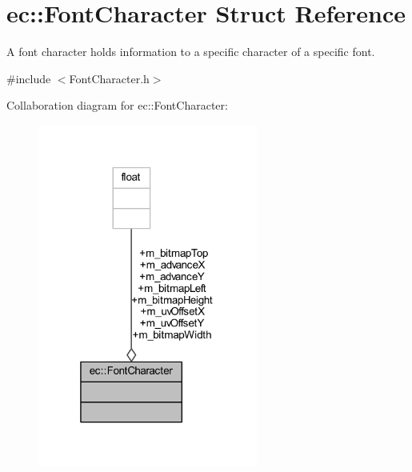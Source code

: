 \hypertarget{structec_1_1_font_character}{}\section{ec\+:\+:Font\+Character Struct Reference}
\label{structec_1_1_font_character}


A font character holds information to a specific character of a specific font.  




{\ttfamily \#include $<$Font\+Character.\+h$>$}



Collaboration diagram for ec\+:\+:Font\+Character\+:\nopagebreak
\begin{figure}[H]
\begin{center}
\leavevmode
\includegraphics[width=205pt]{structec_1_1_font_character__coll__graph}
\end{center}
\end{figure}
